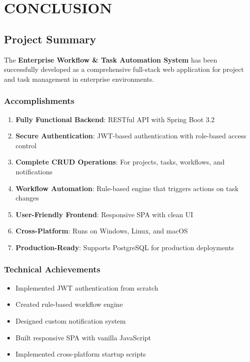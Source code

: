 \documentclass[12pt,a4paper,twoside]{book}
\begin{document}
\chapter{CONCLUSION}

\section{Project Summary}

The \textbf{Enterprise Workflow \& Task Automation System} has been successfully developed as a comprehensive full-stack web application for project and task management in enterprise environments.

\subsection{Accomplishments}

\begin{enumerate}
    \item \textbf{Fully Functional Backend}: RESTful API with Spring Boot 3.2
    \item \textbf{Secure Authentication}: JWT-based authentication with role-based access control
    \item \textbf{Complete CRUD Operations}: For projects, tasks, workflows, and notifications
    \item \textbf{Workflow Automation}: Rule-based engine that triggers actions on task changes
    \item \textbf{User-Friendly Frontend}: Responsive SPA with clean UI
    \item \textbf{Cross-Platform}: Runs on Windows, Linux, and macOS
    \item \textbf{Production-Ready}: Supports PostgreSQL for production deployments
\end{enumerate}

\subsection{Technical Achievements}

\begin{itemize}
    \item Implemented JWT authentication from scratch
    \item Created rule-based workflow engine
    \item Designed custom notification system
    \item Built responsive SPA with vanilla JavaScript
    \item Implemented cross-platform startup scripts
\end{itemize}
\end{document}
